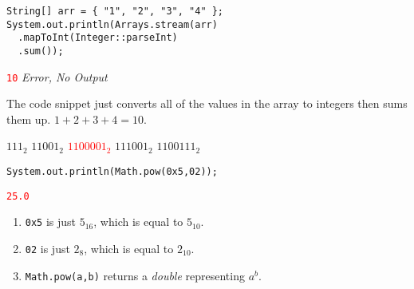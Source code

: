 \documentclass[11pt,addpoints]{exam}
\begin{document}
\begin{questions}
\begin{minipage}{\textwidth}
\begin{verbatim}
String[] arr = { "1", "2", "3", "4" };
System.out.println(Arrays.stream(arr)
  .mapToInt(Integer::parseInt)
  .sum());
\end{verbatim}

\begin{choices}
  \choice \textcolor{red}{\tt 10}
  \choice \textit{Error, No Output} \\
\end{choices}
\end{minipage}

The code snippet just converts all of the values in the array to integers then sums them up. $1+2+3+4=10$. \\

\begin{minipage}{\textwidth}

\begin{choices}
  \choice $111_{2}$
  \choice $11001_{2}$
  \choice \textcolor{red}{$1100001_{2}$}
  \choice $111001_{2}$
  \choice $1100111_{2}$ \\
\end{choices}
\end{minipage}

\begin{minipage}{\textwidth}

\begin{verbatim}
System.out.println(Math.pow(0x5,02));
\end{verbatim}

\begin{choices}
  \choice \textcolor{red}{\tt 25.0} \\
\end{choices}
\end{minipage}

\begin{enumerate}
  \item {\tt 0x5} is just $5_{16}$, which is equal to $5_{10}$.
  \item {\tt 02} is just $2_{8}$, which is equal to $2_{10}$.
  \item {\tt Math.pow(a,b)} returns a \textit{double} representing $a^{b}$.
\end{enumerate}


\end{questions}
\end{document}
